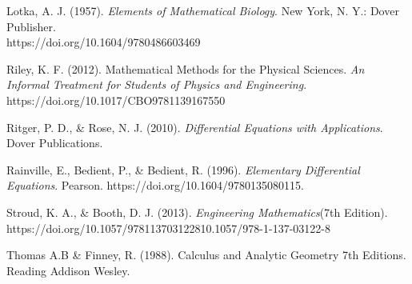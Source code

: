 \documentclass[11pt]{report}
\begin{document}
\begin{description}
		\item Lotka, A. J. (1957). \emph{Elements of Mathematical Biology}. New York, N. Y.: Dover Publisher. \\
		https://doi.org/10.1604/9780486603469
		
		\item Riley, K. F. (2012). Mathematical Methods for the Physical Sciences. \emph{An Informal Treatment for Students of Physics and Engineering}.\\ https://doi.org/10.1017/CBO9781139167550
		
		\item Ritger, P. D., \& Rose, N. J. (2010). \emph{Differential Equations with Applications}. Dover Publications.
		
		\item Rainville, E., Bedient, P., \& Bedient, R. (1996). \emph{Elementary Differential Equations}. Pearson. https://doi.org/10.1604/9780135080115.		
		
		\item Stroud, K. A., \& Booth, D. J. (2013). \emph{Engineering Mathematics}(7th Edition). \\ https://doi.org/10.1057/978113703122810.1057/978-1-137-03122-8
		
		\item Thomas A.B \& Finney, R. (1988). Calculus and Analytic Geometry 7th Editions. Reading Addison Wesley.
	\end{description}
	
\end{document}
